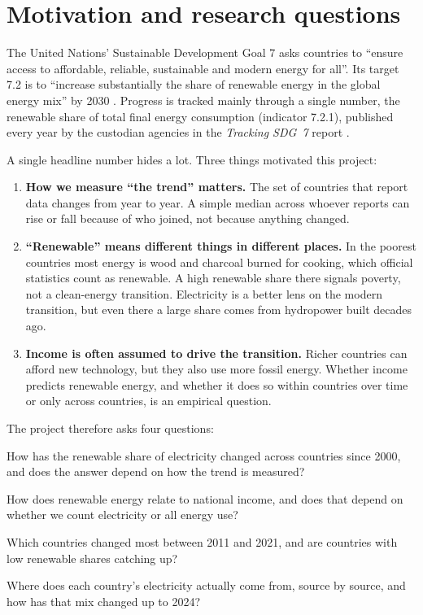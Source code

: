\documentclass[11pt,a4paper]{article}
\begin{document}
\tableofcontents
\clearpage

\section{Motivation and research questions}\label{sec:motivation}

The United Nations' Sustainable Development Goal 7 asks countries to ``ensure access to affordable, reliable, sustainable and modern energy for all''. Its target 7.2 is to ``increase substantially the share of renewable energy in the global energy mix'' by 2030 \citep{un_2030}. Progress is tracked mainly through a single number, the renewable share of total final energy consumption (indicator 7.2.1), published every year by the custodian agencies in the \emph{Tracking SDG~7} report \citep{tracking_sdg7}.

A single headline number hides a lot. Three things motivated this project:

\begin{enumerate}
  \item \textbf{How we measure ``the trend'' matters.} The set of countries that report data changes from year to year. A simple median across whoever reports can rise or fall because of who joined, not because anything changed.
  \item \textbf{``Renewable'' means different things in different places.} In the poorest countries most energy is wood and charcoal burned for cooking, which official statistics count as renewable. A high renewable share there signals poverty, not a clean-energy transition. Electricity is a better lens on the modern transition, but even there a large share comes from hydropower built decades ago.
  \item \textbf{Income is often assumed to drive the transition.} Richer countries can afford new technology, but they also use more fossil energy. Whether income predicts renewable energy, and whether it does so within countries over time or only across countries, is an empirical question.
\end{enumerate}

The project therefore asks four questions:

\begin{description}[leftmargin=2.2em,style=sameline,font=\sffamily\bfseries\color{accent}]
  \item[Q1] How has the renewable share of electricity changed across countries since 2000, and does the answer depend on how the trend is measured?
  \item[Q2] How does renewable energy relate to national income, and does that depend on whether we count electricity or all energy use?
  \item[Q3] Which countries changed most between 2011 and 2021, and are countries with low renewable shares catching up?
  \item[Q4] Where does each country's electricity actually come from, source by source, and how has that mix changed up to 2024?
\end{description}
\end{document}
